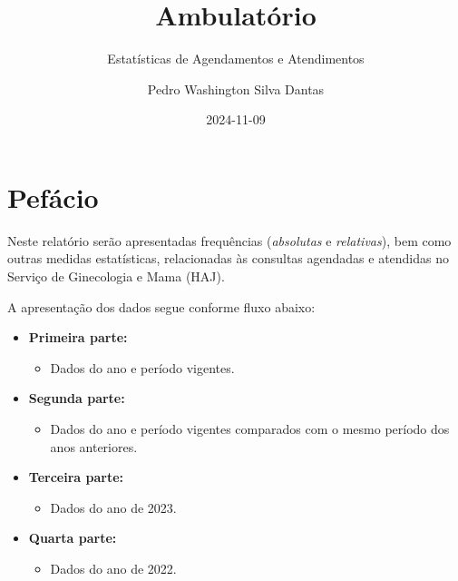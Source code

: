 \documentclass[
  letterpaper,
  DIV=11,
  numbers=noendperiod]{scrreprt}
\title{Ambulatório}
\subtitle{Estatísticas de Agendamentos e Atendimentos}
\author{Pedro Washington Silva Dantas}
\date{2024-11-09}
\providecommand{\tightlist}{%
  \setlength{\itemsep}{0pt}\setlength{\parskip}{0pt}}\usepackage{longtable,booktabs,array}
\renewcommand*\contentsname{Índice}
\newcommand\contentsname{Índice}
\begin{document}
\maketitle
\ifdefined\Shaded\renewenvironment{Shaded}{\begin{tcolorbox}[borderline west={3pt}{0pt}{shadecolor}, frame hidden, breakable, interior hidden, sharp corners, enhanced, boxrule=0pt]}{\end{tcolorbox}}\fi

\renewcommand*\contentsname{Índice}
{
\hypersetup{linkcolor=}
\setcounter{tocdepth}{2}
\tableofcontents
}

\hypertarget{pefuxe1cio}{%
\chapter*{Pefácio}\label{pefuxe1cio}}


Neste relatório serão apresentadas frequências (\emph{absolutas} e
\emph{relativas}), bem como outras medidas estatísticas, relacionadas às
consultas agendadas e atendidas no Serviço de Ginecologia e Mama (HAJ).

A apresentação dos dados segue conforme fluxo abaixo:

\begin{itemize}
\item
  \textbf{Primeira parte:}

  \begin{itemize}
  \tightlist
  \item
    Dados do ano e período vigentes.
  \end{itemize}
\item
  \textbf{Segunda parte:}

  \begin{itemize}
  \tightlist
  \item
    Dados do ano e período vigentes comparados com o mesmo período dos
    anos anteriores.
  \end{itemize}
\item
  \textbf{Terceira parte:}

  \begin{itemize}
  \tightlist
  \item
    Dados do ano de 2023.
  \end{itemize}
\item
  \textbf{Quarta parte:}

  \begin{itemize}
  \tightlist
  \item
    Dados do ano de 2022.
  \end{itemize}
\end{itemize}
\end{document}
